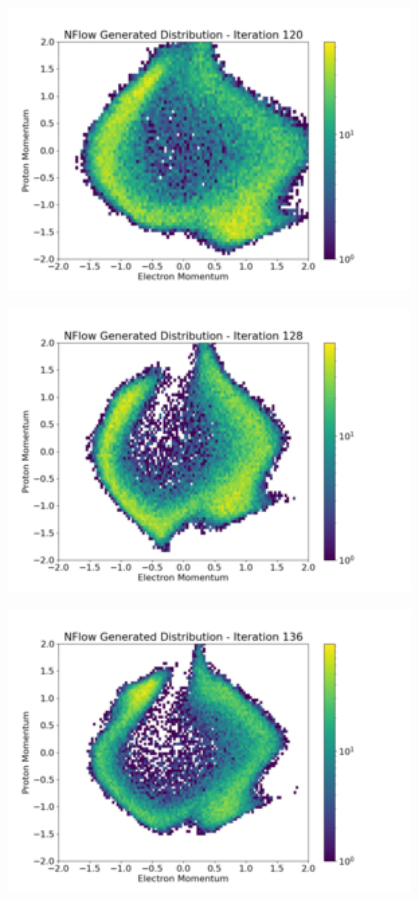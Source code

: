 \documentclass[aspectratio=169]{beamer}
\begin{document}
\begin{frame}[noframenumbering]\centering\includegraphics[width=0.8\textwidth]{images/400training/400training-15.png}\end{frame}
\begin{frame}[noframenumbering]\centering\includegraphics[width=0.8\textwidth]{images/400training/400training-16.png}\end{frame}
\begin{frame}[noframenumbering]\centering\includegraphics[width=0.8\textwidth]{images/400training/400training-17.png}\end{frame}
\end{document}
